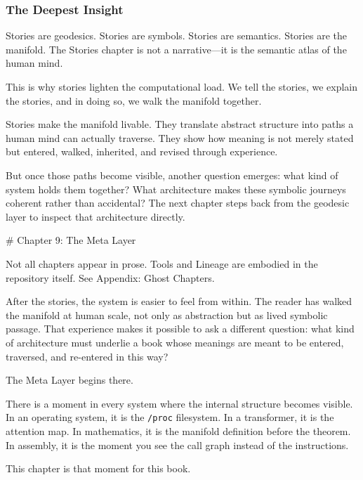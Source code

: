 \documentclass[
]{article}
\begin{document}
\hypertarget{the-deepest-insight}{%
\subsubsection{The Deepest Insight}\label{the-deepest-insight}}

Stories are geodesics. Stories are symbols. Stories are semantics.
Stories are the manifold. The Stories chapter is not a narrative---it is
the semantic atlas of the human mind.

This is why stories lighten the computational load. We tell the stories,
we explain the stories, and in doing so, we walk the manifold together.

Stories make the manifold livable. They translate abstract structure
into paths a human mind can actually traverse. They show how meaning is
not merely stated but entered, walked, inherited, and revised through
experience.

But once those paths become visible, another question emerges: what kind
of system holds them together? What architecture makes these symbolic
journeys coherent rather than accidental? The next chapter steps back
from the geodesic layer to inspect that architecture directly.

\newpage
\vspace*{3cm}
\begin{center}
# Chapter 9: The Meta Layer
\end{center}

Not all chapters appear in prose. Tools and Lineage are embodied in the
repository itself. See Appendix: Ghost Chapters.

After the stories, the system is easier to feel from within. The reader
has walked the manifold at human scale, not only as abstraction but as
lived symbolic passage. That experience makes it possible to ask a
different question: what kind of architecture must underlie a book whose
meanings are meant to be entered, traversed, and re-entered in this way?

The Meta Layer begins there.

There is a moment in every system where the internal structure becomes
visible. In an operating system, it is the \texttt{/proc} filesystem. In
a transformer, it is the attention map. In mathematics, it is the
manifold definition before the theorem. In assembly, it is the moment
you see the call graph instead of the instructions.

This chapter is that moment for this book.
\end{document}
